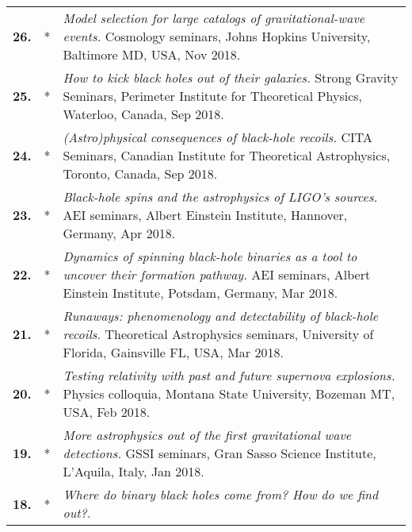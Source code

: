 {\begin{longtable}{rp{0.3cm}p{15.8cm}}
%
\textbf{26.} & * & \textit{Model selection for large catalogs of gravitational-wave events.}
\newline{}
Cosmology seminars, Johns Hopkins University, Baltimore MD, USA, Nov 2018.
\vspace{0.05cm}\\
%
\textbf{25.} & * & \textit{How to kick black holes out of their galaxies.}
\newline{}
Strong Gravity Seminars, Perimeter Institute for Theoretical Physics, Waterloo, Canada, Sep 2018.
\vspace{0.05cm}\\
%
\textbf{24.} & * & \textit{(Astro)physical consequences of black-hole recoils.}
\newline{}
CITA Seminars, Canadian Institute for Theoretical Astrophysics, Toronto, Canada, Sep 2018.
\vspace{0.05cm}\\
%
\textbf{23.} & * & \textit{Black-hole spins and the astrophysics of LIGO's sources.}
\newline{}
AEI seminars, Albert Einstein Institute, Hannover, Germany, Apr 2018.
\vspace{0.05cm}\\
%
\textbf{22.} & * & \textit{Dynamics of spinning black-hole binaries as a tool to uncover their formation pathway.}
\newline{}
AEI seminars, Albert Einstein Institute, Potsdam, Germany, Mar 2018.
\vspace{0.05cm}\\
%
\textbf{21.} & * & \textit{Runaways: phenomenology and detectability of black-hole recoils.}
\newline{}
Theoretical Astrophysics seminars, University of Florida, Gainsville FL, USA, Mar 2018.
\vspace{0.05cm}\\
%
\textbf{20.} & * & \textit{Testing relativity with past and future supernova explosions.}
\newline{}
Physics colloquia, Montana State University, Bozeman MT, USA, Feb 2018.
\vspace{0.05cm}\\
%
\textbf{19.} & * & \textit{More astrophysics out of the first gravitational wave detections.}
\newline{}
GSSI seminars, Gran Sasso Science Institute, L'Aquila, Italy, Jan 2018.
\vspace{0.05cm}\\
%
\textbf{18.} & * & \textit{Where do binary black holes come from? How do we find out?.}

\end{longtable}}
